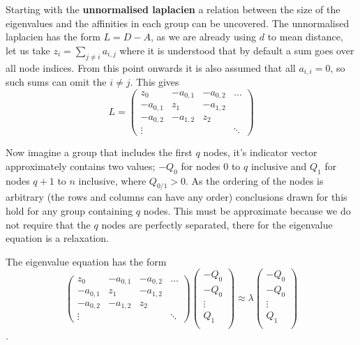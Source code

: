 Starting with the \textbf{unnormalised laplacien} a relation between the size of the eigenvalues and the affinities in each group can be uncovered.
The unnormalised laplacien has the form \(L = D -A\), as we are already using \(d\) to mean distance,
let us take \(z_i = \sum_{j\neq i} a_{i,j}\) where it is understood that by default a sum goes over all node indices.
From this point onwards it is also assumed that all \(a_{i,i} = 0\), so such sums can omit the \(i \ne j\).
This gives 
\begin{equation}
    L = 
    \begin{pmatrix}
        z_0 & -a_{0,1} & -a_{0,2} & \hdots \\
        -a_{0,1} & z_1 & -a_{1,2} & \\
        -a_{0,2} & -a_{1,2} & z_2 & \\
        \vdots   &          &     & \ddots 
    \end{pmatrix}
\end{equation}

Now imagine a group that includes the first \(q\) nodes,
it's indicator vector approximately contains two values; \(-Q_0\) for nodes \(0\) to \(q\) inclusive
and \(Q_1\) for nodes \(q+1\) to \(n\) inclusive,  where \(Q_{0/1} > 0\).
As the ordering of the nodes is arbitrary (the rows and columns can have any order)
conclusions drawn for this hold for any group containing \(q\) nodes.
This must be approximate because we do not require that the \(q\) nodes are perfectly separated,
there for the eigenvalue equation is a relaxation.

The eigenvalue equation has the form
\begin{equation}
    \begin{pmatrix}
        z_0 & -a_{0,1} & -a_{0,2} & \hdots \\
        -a_{0,1} & z_1 & -a_{1,2} & \\
        -a_{0,2} & -a_{1,2} & z_2 & \\
        \vdots   &          &     & \ddots 
    \end{pmatrix}
    \begin{pmatrix}
        -Q_0 \\
        -Q_0 \\
        \vdots \\
        Q_1 \\
    \end{pmatrix}
    \approx \lambda
    \begin{pmatrix}
        -Q_0 \\
        -Q_0 \\
        \vdots \\
        Q_1 \\
    \end{pmatrix}
\end{equation}.

